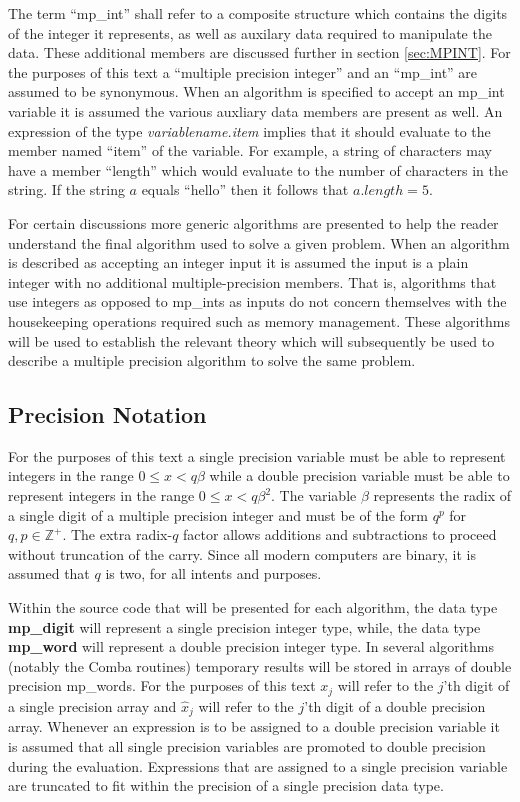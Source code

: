 \documentclass[b5paper]{book}
\def\Z{{\mathbb Z}}
\begin{document}
The term ``mp\_int'' shall refer to a composite structure which contains the digits of the integer it represents, as well 
as auxilary data required to manipulate the data.  These additional members are discussed further in section 
\ref{sec:MPINT}.  For the purposes of this text a ``multiple precision integer'' and an ``mp\_int'' are assumed to be 
synonymous.  When an algorithm is specified to accept an mp\_int variable it is assumed the various auxliary data members 
are present as well.  An expression of the type \textit{variablename.item} implies that it should evaluate to the 
member named ``item'' of the variable.  For example, a string of characters may have a member ``length'' which would 
evaluate to the number of characters in the string.  If the string $a$ equals ``hello'' then it follows that 
$a.length = 5$.  

For certain discussions more generic algorithms are presented to help the reader understand the final algorithm used
to solve a given problem.  When an algorithm is described as accepting an integer input it is assumed the input is 
a plain integer with no additional multiple-precision members.  That is, algorithms that use integers as opposed to 
mp\_ints as inputs do not concern themselves with the housekeeping operations required such as memory management.  These 
algorithms will be used to establish the relevant theory which will subsequently be used to describe a multiple
precision algorithm to solve the same problem.  

\subsection{Precision Notation}
For the purposes of this text a single precision variable must be able to represent integers in the range 
$0 \le x < q \beta$ while a double precision variable must be able to represent integers in the range 
$0 \le x < q \beta^2$.  The variable $\beta$ represents the radix of a single digit of a multiple precision integer and 
must be of the form $q^p$ for $q, p \in \Z^+$.  The extra radix-$q$ factor allows additions and subtractions to proceed 
without truncation of the carry.  Since all modern computers are binary, it is assumed that $q$ is two, for all intents 
and purposes.

 
Within the source code that will be presented for each algorithm, the data type \textbf{mp\_digit} will represent 
a single precision integer type, while, the data type \textbf{mp\_word} will represent a double precision integer type.  In 
several algorithms (notably the Comba routines) temporary results will be stored in arrays of double precision mp\_words.  
For the purposes of this text $x_j$ will refer to the $j$'th digit of a single precision array and $\hat x_j$ will refer to 
the $j$'th digit of a double precision array.  Whenever an expression is to be assigned to a double precision
variable it is assumed that all single precision variables are promoted to double precision during the evaluation.  
Expressions that are assigned to a single precision variable are truncated to fit within the precision of a single
precision data type.
\end{document}
